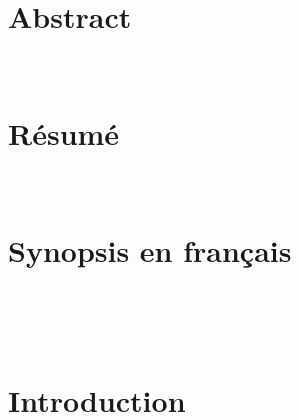 \documentclass[a4paper,11pt,pagebackref=true]{report}
\begin{document}







\normalsize


\newpage \ \newpage



\newpage \ \newpage

% 
\chapter*{Abstract}

 
\newpage \ \newpage

\chapter*{Résumé}


\newpage \ \newpage
\chapter*{Synopsis en français}


\newpage \ \newpage

\dominitoc
\tableofcontents
\listoffigures
\listoftables
\lstlistoflistings

\newpage \ \newpage
\chapter{Introduction}

\end{document}
